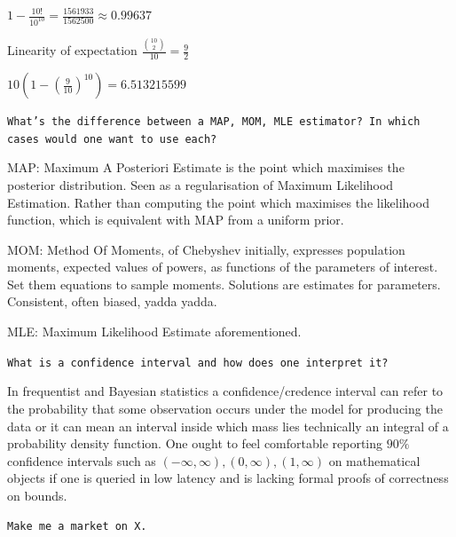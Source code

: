 $1-\frac{10!}{10^{10}} = \boxed{\frac{1561933}{1562500}}\approx 0.99637$

Linearity of expectation $\frac{\binom{10}{2}}{10}=\boxed{\frac{9}{2}}$

$10\left(1-\left( \frac{9}{10} \right)^{10} \right)=\boxed{6.513215599}$

\texttt{What's the difference between a MAP, MOM, MLE estimator? In which cases would one want to use each?}

MAP: Maximum A Posteriori Estimate is the point which maximises the posterior distribution. Seen as a regularisation of Maximum Likelihood Estimation. Rather than computing the point which maximises the likelihood function, which is equivalent with MAP from a uniform prior.

MOM: Method Of Moments, of Chebyshev initially, expresses population moments, expected values of powers, as functions of the parameters of interest. Set them equations to sample moments. Solutions are estimates for parameters. Consistent, often biased, yadda yadda.

MLE: Maximum Likelihood Estimate aforementioned.

\texttt{What is a confidence interval and how does one interpret it?}

In frequentist and Bayesian statistics a confidence/credence interval can refer to the probability that some observation occurs under the model for producing the data or it can mean an interval inside which mass lies technically an integral of a probability density function. One ought to feel comfortable reporting $90\%$ confidence intervals such as $(-\infty, \infty), (0,\infty), (1,\infty)$ on mathematical objects if one is queried in low latency and is lacking formal proofs of correctness on bounds.

\texttt{Make me a market on X.}

